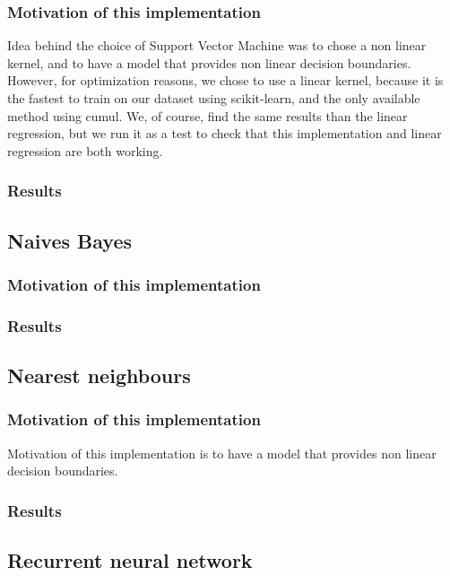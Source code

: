 \documentclass{article}
\begin{document}
    \subsubsection{Motivation of this implementation}
    Idea behind the choice of Support Vector Machine was to chose a non linear kernel, and to have a model that provides non linear decision boundaries.
    However, for optimization reasons, we chose to use a linear kernel, because it is the fastest to train on our dataset using scikit-learn, and the only available method using cumul.
    We, of course, find the same results than the linear regression, but we run it as a test to check that this implementation and linear regression are both working.

    \subsubsection{Results}

    \subsection{Naives Bayes}\label{subsec:naives-bayes}

    \subsubsection{Motivation of this implementation}

    \subsubsection{Results}

    \subsection{Nearest neighbours}\label{subsec:nearest-neigbours}

    \subsubsection{Motivation of this implementation}
    Motivation of this implementation is to have a model that provides non linear decision boundaries.

    \subsubsection{Results}

    \subsection{Recurrent neural network}\label{subsec:recurrent-neural-network}
\end{document}
